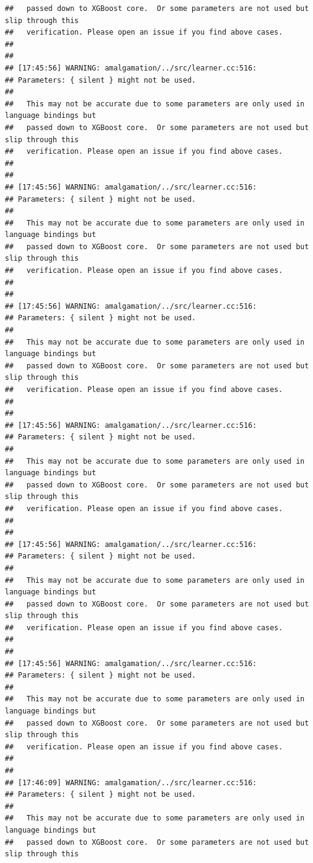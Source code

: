 \documentclass[AMS,STIX2COL]{WileyNJD-v2}\usepackage[]{graphicx}\usepackage[]{color}
\makeatletter
\newenvironment{kframe}{%
 \def\at@end@of@kframe{}%
 \ifinner\ifhmode%
  \def\at@end@of@kframe{\end{minipage}}%
  \begin{minipage}{\columnwidth}%
 \fi\fi%
 \def\FrameCommand##1{\hskip\@totalleftmargin \hskip-\fboxsep
 \colorbox{shadecolor}{##1}\hskip-\fboxsep
     \hskip-\linewidth \hskip-\@totalleftmargin \hskip\columnwidth}%
 \MakeFramed {\advance\hsize-\width
   \@totalleftmargin\z@ \linewidth\hsize
   \@setminipage}}%
 {\par\unskip\endMakeFramed%
 \at@end@of@kframe}
\newenvironment{knitrout}{}{} %
\makeatother
\begin{document}
\begin{knitrout}
\begin{kframe}
\begin{verbatim}
##   passed down to XGBoost core.  Or some parameters are not used but slip through this
##   verification. Please open an issue if you find above cases.
## 
## 
## [17:45:56] WARNING: amalgamation/../src/learner.cc:516: 
## Parameters: { silent } might not be used.
## 
##   This may not be accurate due to some parameters are only used in language bindings but
##   passed down to XGBoost core.  Or some parameters are not used but slip through this
##   verification. Please open an issue if you find above cases.
## 
## 
## [17:45:56] WARNING: amalgamation/../src/learner.cc:516: 
## Parameters: { silent } might not be used.
## 
##   This may not be accurate due to some parameters are only used in language bindings but
##   passed down to XGBoost core.  Or some parameters are not used but slip through this
##   verification. Please open an issue if you find above cases.
## 
## 
## [17:45:56] WARNING: amalgamation/../src/learner.cc:516: 
## Parameters: { silent } might not be used.
## 
##   This may not be accurate due to some parameters are only used in language bindings but
##   passed down to XGBoost core.  Or some parameters are not used but slip through this
##   verification. Please open an issue if you find above cases.
## 
## 
## [17:45:56] WARNING: amalgamation/../src/learner.cc:516: 
## Parameters: { silent } might not be used.
## 
##   This may not be accurate due to some parameters are only used in language bindings but
##   passed down to XGBoost core.  Or some parameters are not used but slip through this
##   verification. Please open an issue if you find above cases.
## 
## 
## [17:45:56] WARNING: amalgamation/../src/learner.cc:516: 
## Parameters: { silent } might not be used.
## 
##   This may not be accurate due to some parameters are only used in language bindings but
##   passed down to XGBoost core.  Or some parameters are not used but slip through this
##   verification. Please open an issue if you find above cases.
## 
## 
## [17:45:56] WARNING: amalgamation/../src/learner.cc:516: 
## Parameters: { silent } might not be used.
## 
##   This may not be accurate due to some parameters are only used in language bindings but
##   passed down to XGBoost core.  Or some parameters are not used but slip through this
##   verification. Please open an issue if you find above cases.
## 
## 
## [17:46:09] WARNING: amalgamation/../src/learner.cc:516: 
## Parameters: { silent } might not be used.
## 
##   This may not be accurate due to some parameters are only used in language bindings but
##   passed down to XGBoost core.  Or some parameters are not used but slip through this

\end{verbatim}
\end{kframe}
\end{knitrout}
\end{document}
